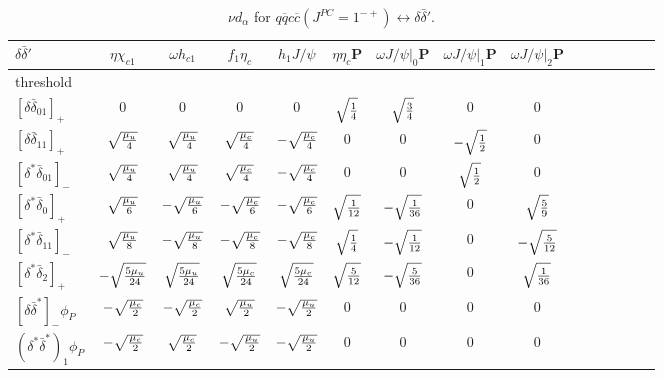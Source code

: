 \documentclass[a4j]{jarticle}
\def\Jpsi{{J\!/\!\psi}{}}
\def\cbar{\overline{{c}}}
\def\qbar{\overline{{q}}}
\begin{document}
\begin{table}[htp]
\caption{$\nu d_\alpha$ for $q\qbar c\cbar(J^{PC}=1^{-+})\leftrightarrow \delta\bar\delta'$. }
\def\ssz{~${}^1S_0$}
\def\tso{~${}^3S_1$}
\def\spo{~${}^1P_1$}
\def\tpz{~${}^3P_0$}
\def\tpo{~${}^3P_1$}
\def\tpt{~${}^3P_2$}
\def\rtmc{\sqrt{\mu_c}}
\def\rtmu{\sqrt{\mu_u}}
\renewcommand\arraystretch{1.8}
\setlength\tabcolsep{1mm}
\begin{tabular}{l|cc|cc|cccccccccc}\hline
$\delta\bar\delta'$            & $\eta$$\chi_{c1}$& $\omega$$h_{c1}$&  $f_{1}$$\eta_c$& $h_1$$\Jpsi$ &$\eta$$\eta_c$P&  $\omega$$\Jpsi$$|_0$P &  $\omega$$\Jpsi$$|_1$P&  $\omega$$\Jpsi$$|_2$P\\
\hline
threshold                %
\\
\hline
 $[\delta   \bar\delta_{01}]_+$    &  0                      &  0                       &  0                      &  0                       & $ \sqrt{1\over 4}    $& $ \sqrt{3\over 4}    $& 0                    &  0                  \\
 $[\delta   \bar\delta_{11}]_+$    & $ \sqrt{\mu_u\over 4}  $& $  \sqrt{\mu_u\over 4}  $& $ \sqrt{\mu_c\over 4}  $& $ -\sqrt{\mu_c\over 4}  $&  0                    &  0                    & $-\sqrt{1\over 2}   $&  0                  \\
 $[\delta^* \bar\delta_{01}]_-$    & $ \sqrt{\mu_u\over 4}  $& $  \sqrt{\mu_u\over 4}  $& $ \sqrt{\mu_c\over 4}  $& $ -\sqrt{\mu_c\over 4}  $&  0                    &  0                    & $ \sqrt{1\over 2}   $&  0                  \\
 $[\delta^* \bar\delta_{0} ]_+$    & $ \sqrt{\mu_u\over 6}  $& $ -\sqrt{\mu_u\over 6}  $& $-\sqrt{\mu_c\over 6}  $& $ -\sqrt{\mu_c\over 6}  $& $ \sqrt{1\over 12}   $& $-\sqrt{1\over 36}   $& 0                    & $ \sqrt{5\over 9}   $\\
 $[\delta^* \bar\delta_{11}]_-$    & $ \sqrt{\mu_u\over 8}  $& $ -\sqrt{\mu_u\over 8}  $& $-\sqrt{\mu_c\over 8}  $& $ -\sqrt{\mu_c\over 8}  $& $ \sqrt{1\over 4}    $& $-\sqrt{1\over 12}   $& 0                    & $-\sqrt{5\over 12}  $\\
 $[\delta^* \bar\delta_{2} ]_+$    & $-\sqrt{5\mu_u\over 24}$& $  \sqrt{5\mu_u\over 24}$& $ \sqrt{5\mu_c\over 24}$& $  \sqrt{5\mu_c\over 24}$& $ \sqrt{5\over 12}   $& $-\sqrt{5\over 36}   $& 0                    & $ \sqrt{1\over 36}  $\\\hline%
%
 $[\delta   \bar\delta^*]_-\phi_P$ & $-\sqrt{\mu_c\over 2}  $& $-\sqrt{\mu_c\over 2}   $& $ \sqrt{\mu_u\over 2}  $& $-\sqrt{\mu_u\over 2}   $&  0&  0 &  0&  0 \\
 $(\delta^* \bar\delta^*)_1\phi_P$ & $-\sqrt{\mu_c\over 2}  $& $ \sqrt{\mu_c\over 2}   $& $-\sqrt{\mu_u\over 2}  $& $-\sqrt{\mu_u\over 2}   $&  0&  0 &  0&  0 
\\ \hline 
\end{tabular}
\label{tbl:3b}
\end{table}
\end{document}
